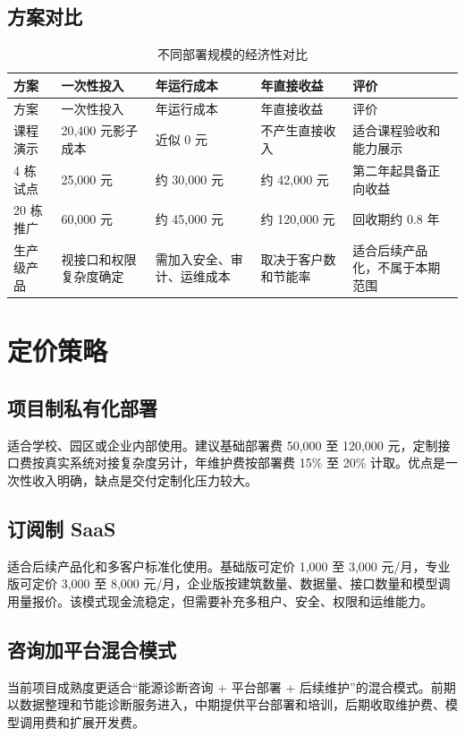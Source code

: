 \documentclass[12pt,a4paper]{ctexart}
\begin{document}
\subsection{方案对比}
\begin{longtable}{L{3cm}L{3.2cm}L{3.2cm}L{3.2cm}L{2cm}}
\caption{不同部署规模的经济性对比}\\
\toprule
方案 & 一次性投入 & 年运行成本 & 年直接收益 & 评价 \\
\midrule
\endfirsthead
\toprule
方案 & 一次性投入 & 年运行成本 & 年直接收益 & 评价 \\
\midrule
\endhead
课程演示 & 20,400 元影子成本 & 近似 0 元 & 不产生直接收入 & 适合课程验收和能力展示 \\
4 栋试点 & 25,000 元 & 约 30,000 元 & 约 42,000 元 & 第二年起具备正向收益 \\
20 栋推广 & 60,000 元 & 约 45,000 元 & 约 120,000 元 & 回收期约 0.8 年 \\
生产级产品 & 视接口和权限复杂度确定 & 需加入安全、审计、运维成本 & 取决于客户数和节能率 & 适合后续产品化，不属于本期范围 \\
\bottomrule
\end{longtable}

\section{定价策略}
\subsection{项目制私有化部署}
适合学校、园区或企业内部使用。建议基础部署费 50,000 至 120,000 元，定制接口费按真实系统对接复杂度另计，年维护费按部署费 15\% 至 20\% 计取。优点是一次性收入明确，缺点是交付定制化压力较大。

\subsection{订阅制 SaaS}
适合后续产品化和多客户标准化使用。基础版可定价 1,000 至 3,000 元/月，专业版可定价 3,000 至 8,000 元/月，企业版按建筑数量、数据量、接口数量和模型调用量报价。该模式现金流稳定，但需要补充多租户、安全、权限和运维能力。

\subsection{咨询加平台混合模式}
当前项目成熟度更适合“能源诊断咨询 + 平台部署 + 后续维护”的混合模式。前期以数据整理和节能诊断服务进入，中期提供平台部署和培训，后期收取维护费、模型调用费和扩展开发费。
\end{document}
